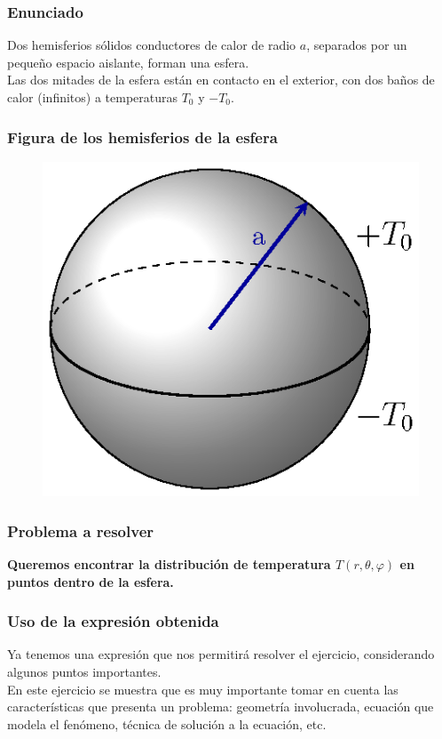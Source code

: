 \documentclass[12pt]{beamer}
\begin{document}
\begin{frame}
\frametitle{Enunciado}
Dos hemisferios sólidos conductores de calor de radio $a$, separados por un pequeño espacio aislante, forman una esfera.
\\
\bigskip
\pause
Las dos mitades de la esfera están en contacto en el exterior, con dos baños de calor (infinitos) a temperaturas $T_{0}$ y $-T_{0}$.
\end{frame}
\begin{frame}
\frametitle{Figura de los hemisferios de la esfera}
\begin{figure}[H]
    \centering
    \includegraphics[scale=1.2]{Imagenes/Ejemplo_Esfera_01.eps}
\end{figure}
\end{frame}
\begin{frame}
\frametitle{Problema a resolver}
\textbf{Queremos encontrar la distribución de temperatura $T (r, \theta, \varphi)$ en puntos dentro de la esfera.}
\end{frame}
\begin{frame}
\frametitle{Uso de la expresión obtenida}
Ya tenemos una expresión que nos permitirá resolver el ejercicio, considerando algunos puntos importantes.
\\
\bigskip
\pause
En este ejercicio se muestra que es muy importante tomar en cuenta las características que presenta un problema: geometría involucrada, ecuación que modela el fenómeno, técnica de solución a la ecuación, etc.
\end{frame}
\end{document}

